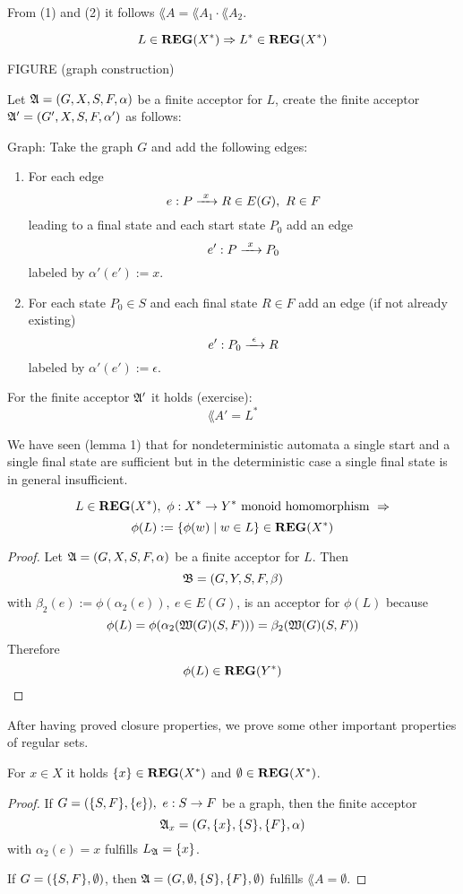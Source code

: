 From (1) and (2) it follows $\lang{A} = \lang{A}_1 \cdot
\lang{A}_2$.

\begin{theorem}
\[ L \in \mbox{{\bf REG}}(X^*) \Rightarrow L^* \in \mbox{{\bf REG}}(X^*) \]
\end{theorem}

FIGURE (graph construction)

Let $\mbox{$\mathfrak{A}$} = (G, X, S, F, \alpha)$	be a finite acceptor for $L$, create the
finite acceptor $\mbox{$\mathfrak{A'}$} = (G', X, S, F, \alpha')$ as follows:

Graph: Take the graph $G$ and add the following edges: 

\begin{enumerate}
  \item For each edge \[e : P \xrightarrow{\ {x}\ } R \in E(G),\ R \in F\] leading to a
  final state and each start state $P_0$ add an edge \[e' : P \xrightarrow{\ {x}\ } P_0 \]
  labeled by $\alpha'(e') := x$.
  \item For each state $P_0 \in S$ and each final state $R \in F$ add an edge
  (if not already existing) \[ e' : P_0 \xrightarrow{\ {\epsilon}\ } R \]
  labeled by $\alpha'(e') := \epsilon$.
\end{enumerate}

For the finite acceptor $\mbox{$\mathfrak{A'}$}$ it holds (exercise): \[ \lang{A'} = L^* \]

We have seen (lemma 1) that for nondeterministic automata a single start and a
single final state are sufficient but in the deterministic case a single final
state is in general insufficient.

\bigskip
\begin{theorem}
\[ L \in \mbox{{\bf REG}}(X^*),\ \phi : X^* \to Y^* \mbox{ monoid homomorphism }
\Rightarrow \]
\[ \phi(L) := \mbox{$\{\phi(w) \mid w \in L\}$} \in \mbox{{\bf REG}}(X^*) \]
\end{theorem}
\begin{proof}
Let $\mbox{$\mathfrak{A}$} = (G, X, S, F, \alpha)$ be a finite acceptor for $L$. Then \[
\mbox{$\mathfrak{B}$} = (G, Y, S, F, \beta)\] with $\beta_2(e) := \phi(\alpha_2(e)),\ e \in
E(G)$, is an acceptor for $\phi(L)$ because \[\phi(L) =
\phi(\alpha_2(\mbox{$\mathfrak{W}(G)$}(S, F))) = \beta_2(\mbox{$\mathfrak{W}(G)$}(S,F))\]
Therefore \[ \phi(L) \in \mbox{{\bf REG}}(Y^*) \]
\end{proof}

After having proved closure properties, we prove some other important properties
of regular sets.

\begin{lemma}
For $x \in X$ it holds $\mbox{$\{x\}$} \in \mbox{{\bf REG}}(X^*)$ and $\emptyset \in \mbox{{\bf REG}}(X^*)$.
\end{lemma}
\begin{proof}
If $G = (\mbox{$\{S,F\}$}, \mbox{$\{e\}$}),\ e: S \to F$ be a graph, then the finite
acceptor \[\mbox{$\mathfrak{A}$}_x = (G, \mbox{$\{x\}$}, \mbox{$\{S\}$}, \mbox{$\{F\}$}, \alpha)\] with $\alpha_2(e) =
x$ fulfills $\mbox{$L_{\mathfrak{A}}$} = \mbox{$\{x\}$}$.

If $G = (\mbox{$\{S,F\}$}, \emptyset)$, then $\mbox{$\mathfrak{A}$} = (G, \emptyset, \mbox{$\{S\}$},
\mbox{$\{F\}$}, \emptyset)$ fulfills $\lang{A} = \emptyset$.
\end{proof}

